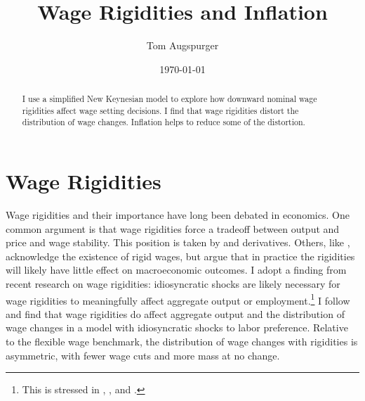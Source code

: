 \documentclass[12pt,a4paper]{scrartcl}            %
\begin{document}
\makeatletter
\def\blfootnote{\xdef\@thefnmark{}\@footnotetext}
\makeatother



\title{Wage Rigidities and Inflation}
\author{Tom Augspurger}                               %
\date{\monthYear\today}
\maketitle

\begin{abstract}
I use a simplified New Keynesian model to explore how downward nominal wage rigidities affect wage setting decisions.
I find that wage rigidities distort the distribution of wage changes.
Inflation helps to reduce some of the distortion.

\end{abstract}

\section{Wage Rigidities}
\label{sec:wage_rigidities}

Wage rigidities and their importance have long been debated in economics.
One common argument is that wage rigidities force a tradeoff between output and price and wage stability.
This position is taken by \cite{erceg_henderson_levin_1999} and derivatives.
Others, like \cite{goodfriend_king_2001}, acknowledge the existence of rigid wages, but argue that in practice the rigidities will likely have little effect on macroeconomic outcomes.
I adopt a finding from recent research on wage rigidities: idiosyncratic shocks are likely necessary for wage rigidities to meaningfully affect aggregate output or employment.\footnote{
This is stressed in \cite{elsby_2009}, \cite{benigno_ricci_2011}, and \cite{daly_hobijn_2013}.}
I follow \cite{daly_hobijn_2013} and find that wage rigidities do affect aggregate output and the distribution of wage changes in a model with idiosyncratic shocks to labor preference.
Relative to the flexible wage benchmark, the distribution of wage changes with rigidities is asymmetric, with fewer wage cuts and more mass at no change.
\end{document}
